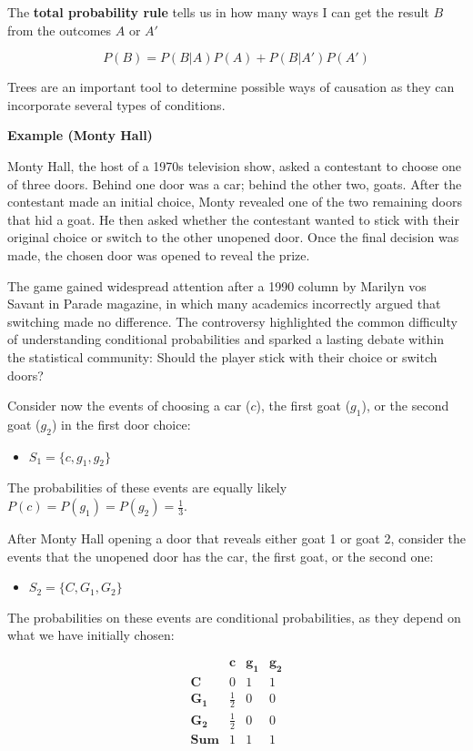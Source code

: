 \documentclass[
]{book}
\providecommand{\tightlist}{%
  \setlength{\itemsep}{0pt}\setlength{\parskip}{0pt}}
\begin{document}
The \textbf{total probability rule} tells us in how many ways I can get the result \(B\) from the outcomes \(A\) or \(A'\)

\[P(B)=P(B|A)P(A)+P(B|A')P(A')\]

Trees are an important tool to determine possible ways of causation as they can incorporate several types of conditions.

\textbf{Example (Monty Hall)}

Monty Hall, the host of a 1970s television show, asked a contestant to choose one of three doors. Behind one door was a car; behind the other two, goats. After the contestant made an initial choice, Monty revealed one of the two remaining doors that hid a goat. He then asked whether the contestant wanted to stick with their original choice or switch to the other unopened door. Once the final decision was made, the chosen door was opened to reveal the prize.

The game gained widespread attention after a 1990 column by Marilyn vos Savant in Parade magazine, in which many academics incorrectly argued that switching made no difference. The controversy highlighted the common difficulty of understanding conditional probabilities and sparked a lasting debate within the statistical community: Should the player stick with their choice or switch doors?

Consider now the events of choosing a car (\(c\)), the first goat (\(g_1\)), or the second goat (\(g_2\)) in the first door choice:

\begin{itemize}
\tightlist
\item
  \(S_1=\{c, g_1, g_2\}\)
\end{itemize}

The probabilities of these events are equally likely \(P(c)=P(g_1)=P(g_2)=\frac{1}{3}\).

After Monty Hall opening a door that reveals either goat 1 or goat 2, consider the events that the unopened door has the car, the first goat, or the second one:

\begin{itemize}
\tightlist
\item
  \(S_2=\{C, G_1, G_2\}\)
\end{itemize}

The probabilities on these events are conditional probabilities, as they depend on what we have initially chosen:

\[
\begin{array}{cc|c|c}
    & \mathbf{c} & \mathbf{g_1} & \mathbf{g_2}\\ 
    \mathbf{C} & 0 & 1 & 1\\ 
    \mathbf{G_1} & \frac{1}{2} & 0 & 0\\ 
    \mathbf{G_2} & \frac{1}{2} & 0 & 0 \\ 
    \mathbf{Sum} & 1 & 1 & 1
\end{array}
\]
\end{document}
